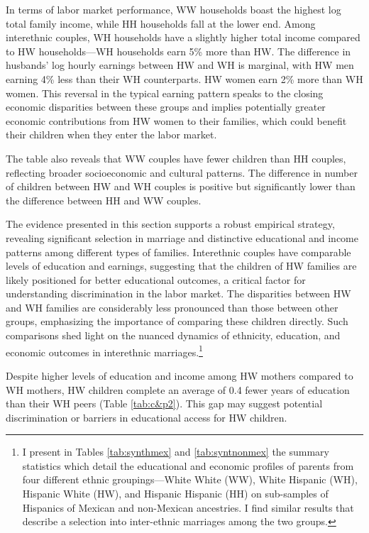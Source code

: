 In terms of labor market performance, WW households boast the highest log total family income, while HH households fall at the lower end.  Among interethnic couples, WH households have a slightly higher total income compared to HW households---WH households earn 5\% more than HW. The difference in husbands’ log hourly earnings between HW and WH is marginal, with HW men earning 4\% less than their WH counterparts. HW women earn 2\% more than WH women. This reversal in the typical earning pattern speaks to the closing economic disparities between these groups and implies potentially greater economic contributions from HW women to their families, which could benefit their children when they enter the labor market.

The table also reveals that WW couples have fewer children than HH couples, reflecting broader socioeconomic and cultural patterns. The difference in number of children between HW and WH couples is positive but significantly lower than the difference between HH and WW couples.

The evidence presented in this section supports a robust empirical strategy, revealing significant selection in marriage and distinctive educational and income patterns among different types of families. Interethnic couples have comparable levels of education and earnings, suggesting that the children of HW families are likely positioned for better educational outcomes, a critical factor for understanding discrimination in the labor market. The disparities between HW and WH families are considerably less pronounced than those between other groups, emphasizing the importance of comparing these children directly. Such comparisons shed light on the nuanced dynamics of ethnicity, education, and economic outcomes in interethnic marriages.\footnote{I present in Tables \ref{tab:synthmex} and \ref{tab:syntnonmex} the summary statistics which detail the educational and economic profiles of parents from four different ethnic groupings—White White (WW), White Hispanic (WH), Hispanic White (HW), and Hispanic Hispanic (HH) on sub-samples of Hispanics of Mexican and non-Mexican ancestries. I find similar results that describe a selection into inter-ethnic marriages among the two groups.} 

Despite higher levels of education and income among HW mothers compared to WH mothers, HW children complete an average of 0.4 fewer years of education than their WH peers (Table \ref{tab:c&p2}). This gap may suggest potential discrimination or barriers in educational access for HW children.

